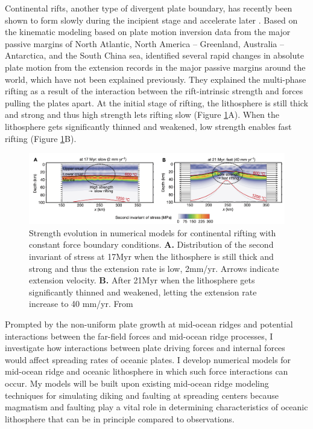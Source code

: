 \documentclass[letterpaper,12pt,notitle]{memphisthesis}                     %
\begin{document}
Continental rifts, another type of divergent plate boundary, has recently been shown to form slowly during the incipient stage and accelerate later \citep{Brune2016}. Based on the kinematic modeling based on plate motion inversion data from the major passive margins of North Atlantic, North America – Greenland, Australia – Antarctica, and the South China sea, \citet{Brune2016} identified several rapid changes in absolute plate motion from the extension records in the major passive margins around the world, which have not been explained previously. They explained the multi-phase rifting as a result of the interaction between the rift-intrinsic strength and forces pulling the plates apart. At the initial stage of rifting, the lithosphere is still thick and strong and thus high strength lets rifting slow (Figure \ref{fig:brune}A). When the lithosphere gets significantly thinned and weakened, low strength enables fast rifting (Figure \ref{fig:brune}B).
%
\begin{figure}[!htb]
	\centering
	\includegraphics[width=0.99\linewidth]{./figs/brune.png}
	\caption{Strength evolution in numerical models for continental rifting with constant force boundary conditions. \textbf{A.} Distribution of the second invariant of stress at 17Myr when the lithosphere is still thick and strong and thus the extension rate is low, 2mm/yr. Arrows indicate extension velocity. \textbf{B.} After 21Myr when the lithosphere gets significantly thinned and weakened, letting the extension rate increase to 40 mm/yr. From \citet{Brune2016}}
	\label{fig:brune}
\end{figure}

Prompted by the non-uniform plate growth at mid-ocean ridges and potential interactions between the far-field forces and mid-ocean ridge processes, I investigate how interactions between plate driving forces and internal forces would affect spreading rates of oceanic plates. I develop numerical models for mid-ocean ridge and oceanic lithosphere in which such force interactions can occur. My models will be built upon existing mid-ocean ridge modeling techniques for simulating diking and faulting at spreading centers because magmatism and faulting play a vital role in determining characteristics of oceanic lithosphere that can be in principle compared to observations.
\end{document}
